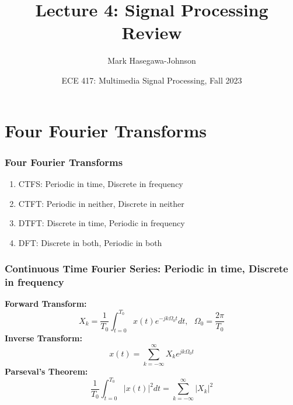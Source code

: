 \documentclass{beamer}
\title{Lecture 4: Signal Processing Review}
\author{Mark Hasegawa-Johnson}
\date{ECE 417: Multimedia Signal Processing, Fall 2023}
\institute{University of Illinois}
\begin{document}
\begin{frame}
  \maketitle
\end{frame}

\begin{frame}
  \tableofcontents
\end{frame}

\section{Four Fourier Transforms}
\setcounter{subsection}{1}

\begin{frame}
  \frametitle{Four Fourier Transforms}
  \begin{enumerate}
  \item CTFS: Periodic in time, Discrete in frequency
  \item CTFT: Periodic in neither, Discrete in neither
  \item DTFT: Discrete in time, Periodic in frequency
  \item DFT: Discrete in both, Periodic in both
  \end{enumerate}
\end{frame}

\begin{frame}
  \frametitle{Continuous Time Fourier Series: Periodic in time, Discrete in frequency}

  \textbf{Forward Transform:}
  \begin{displaymath}
    X_k = \frac{1}{T_0}\int_{t=0}^{T_0} x(t)e^{-jk\Omega_0 t}dt,~~~\Omega_0=\frac{2\pi}{T_0}
  \end{displaymath}
  \textbf{Inverse Transform:}
  \begin{displaymath}
    x(t) = \sum_{k=-\infty}^\infty X_ke^{jk\Omega_0 t}
  \end{displaymath}
  \textbf{Parseval's Theorem:}
  \begin{displaymath}
    \frac{1}{T_0}\int_{t=0}^{T_0}|x(t)|^2dt=\sum_{k=-\infty}^\infty|X_k|^2
  \end{displaymath}
\end{frame}
\end{document}

